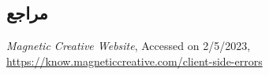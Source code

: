{\subsection*{مراجع}

\begin{latin}
	\begingroup
	\renewcommand{\section}[2]{}%
	
\begin{thebibliography}{9}

	
	\textit{Magnetic Creative Website},
	Accessed on 2/5/2023,
	\url{https://know.magneticcreative.com/client-side-errors}

\end{thebibliography}
\endgroup
\end{latin}

}
